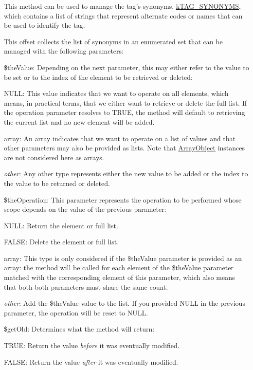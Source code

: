 This method can be used to manage the tag's synonyms, \hyperlink{}{k\-T\-A\-G\-\_\-\-S\-Y\-N\-O\-N\-Y\-M\-S}, which contains a list of strings that represent alternate codes or names that can be used to identify the tag.

This offset collects the list of synonyms in an enumerated set that can be managed with the following parameters\-:


\begin{DoxyItemize}
\item {\ttfamily \$the\-Value}\-: Depending on the next parameter, this may either refer to the value to be set or to the index of the element to be retrieved or deleted\-: 
\begin{DoxyItemize}
\item {\ttfamily N\-U\-L\-L}\-: This value indicates that we want to operate on all elements, which means, in practical terms, that we either want to retrieve or delete the full list. If the operation parameter resolves to {\ttfamily T\-R\-U\-E}, the method will default to retrieving the current list and no new element will be added. 
\item {\ttfamily array}\-: An array indicates that we want to operate on a list of values and that other parameters may also be provided as lists. Note that \hyperlink{}{Array\-Object} instances are not considered here as arrays. 
\item {\itshape other}\-: Any other type represents either the new value to be added or the index to the value to be returned or deleted. 
\end{DoxyItemize}
\item {\ttfamily \$the\-Operation}\-: This parameter represents the operation to be performed whose scope depends on the value of the previous parameter\-: 
\begin{DoxyItemize}
\item {\ttfamily N\-U\-L\-L}\-: Return the element or full list. 
\item {\ttfamily F\-A\-L\-S\-E}\-: Delete the element or full list. 
\item {\ttfamily array}\-: This type is only considered if the {\ttfamily \$the\-Value} parameter is provided as an array\-: the method will be called for each element of the {\ttfamily \$the\-Value} parameter matched with the corresponding element of this parameter, which also means that both both parameters must share the same count. 
\item {\itshape other}\-: Add the {\ttfamily \$the\-Value} value to the list. If you provided {\ttfamily N\-U\-L\-L} in the previous parameter, the operation will be reset to {\ttfamily N\-U\-L\-L}. 
\end{DoxyItemize}
\item {\ttfamily \$get\-Old}\-: Determines what the method will return\-: 
\begin{DoxyItemize}
\item {\ttfamily T\-R\-U\-E}\-: Return the value {\itshape before} it was eventually modified. 
\item {\ttfamily F\-A\-L\-S\-E}\-: Return the value {\itshape after} it was eventually modified. 
\end{DoxyItemize}
\end{DoxyItemize}



